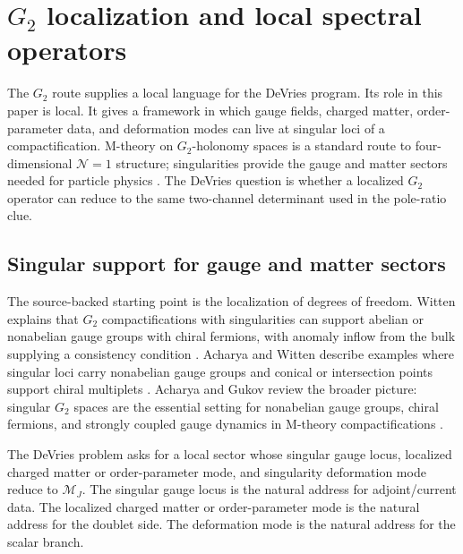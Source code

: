 \section{\texorpdfstring{$G_2$}{G2} localization and local spectral operators}
\label{sec:g2-localization}

The \(G_2\) route supplies a local language for the DeVries program.  Its role
in this paper is local.  It gives a framework in which gauge fields,
charged matter, order-parameter data, and deformation modes can live at singular
loci of a compactification.  M-theory on \(G_2\)-holonomy spaces is a standard
route to four-dimensional \(\mathcal N=1\) structure; singularities provide the
gauge and matter sectors needed for particle physics
\cite{WittenG2Anomaly2001,AcharyaWitten2001,AcharyaGukov2004}.  The DeVries
question is whether a localized \(G_2\) operator can reduce to the same
two-channel determinant used in the pole-ratio clue.

\subsection{Singular support for gauge and matter sectors}
\label{sec:g2-singular-support}

The source-backed starting point is the localization of degrees of freedom.  Witten explains that \(G_2\) compactifications with singularities can support abelian or nonabelian gauge groups with chiral fermions, with anomaly inflow from the bulk supplying a consistency condition \cite{WittenG2Anomaly2001}.  Acharya and Witten describe examples where singular loci carry nonabelian gauge groups and conical or intersection points support chiral multiplets \cite{AcharyaWitten2001}.  Acharya and Gukov review the broader picture: singular \(G_2\) spaces are the essential setting for nonabelian gauge groups, chiral fermions, and strongly coupled gauge dynamics in M-theory compactifications \cite{AcharyaGukov2004}.

The DeVries problem asks for a local sector whose singular gauge locus,
localized charged matter or order-parameter mode, and singularity deformation
mode reduce to \(\mathcal M_J\).
The singular gauge locus is the natural address for adjoint/current data.  The localized charged matter or order-parameter mode is the natural address for the doublet side.  The deformation mode is the natural address for the scalar branch.

